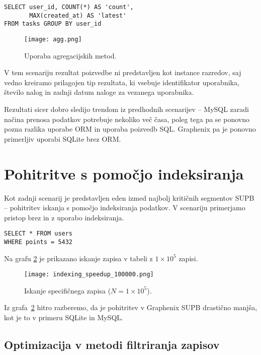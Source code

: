 \documentclass[a4paper,12pt,openright]{book}
\begin{document}
\begin{verbatim}
SELECT user_id, COUNT(*) AS 'count', 
       MAX(created_at) AS 'latest' 
FROM tasks GROUP BY user_id
\end{verbatim}

    \begin{figure}[H]
        \centerline{\texttt{[image: agg.png]}}
        \caption{Uporaba agregacijskih metod.}
        \label{agg}
    \end{figure}

    \noindent
    V tem scenariju rezultat poizvedbe ni predstavljen kot instance razredov, saj vedno kreiramo prilagojen tip rezultata, ki vsebuje identifikator uporabnika, število nalog in zadnji datum naloge za vezanega uporabnika.

    Rezultati sicer dobro sledijo trendom iz predhodnih scenarijev – MySQL zaradi načina prenosa podatkov potrebuje nekoliko več časa, poleg tega pa se ponovno pozna razlika uporabe ORM in uporaba poizvedb SQL. Graphenix pa je ponovno primerljiv uporabi SQLite brez ORM.

    \section{Pohitritve s pomočjo indeksiranja}

    Kot zadnji scenarij je predstavljen eden izmed najbolj kritičnih segmentov SUPB – pohitritev iskanja s pomočjo indeksiranja podatkov. V scenariju primerjamo pristop brez in z uporabo indeksiranja.
    
\begin{verbatim}
SELECT * FROM users
WHERE points = 5432
\end{verbatim}

    \noindent
    Na grafu \ref{old_speedup} je prikazano iskanje zapisa v tabeli z $ 1 \times 10^5$ zapisi.

    \begin{figure}[H]
        \centerline{\texttt{[image: indexing\_speedup\_100000.png]}}
        \caption{Iskanje specifičnega zapisa ($N = 1 \times 10^5$).}
        \label{old_speedup}
    \end{figure}

    \noindent
    Iz grafa~\ref{old_speedup} hitro razberemo, da je pohitritev v Graphenix SUPB drastično manjša, kot je to v primeru SQLite in MySQL.

    \subsection{Optimizacija v metodi filtriranja zapisov}
\end{document}
